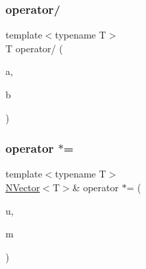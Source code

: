 \mbox{\label{class_n_p_matrix_a12aeb8ceae55cbd9937701cb056b113b}} 
\subsubsection{\texorpdfstring{operator/}{operator/}\hspace{0.1cm}{\footnotesize\ttfamily [2/2]}}
{\footnotesize\ttfamily template$<$typename T$>$ \\
T operator/ (\begin{DoxyParamCaption}\item[{const \mbox{\hyperlink{class_n_p_matrix}{N\+P\+Matrix}}$<$ T $>$ \&}]{a,  }\item[{const \mbox{\hyperlink{class_n_p_matrix}{N\+P\+Matrix}}$<$ T $>$ \&}]{b }\end{DoxyParamCaption})\hspace{0.3cm}{\ttfamily [friend]}}

\mbox{\label{class_n_p_matrix_a3ac1836124d15848447935dd5ab657eb}} 
\subsubsection{\texorpdfstring{operator $\ast$=}{operator *=}}
{\footnotesize\ttfamily template$<$typename T$>$ \\
\mbox{\hyperlink{class_n_vector}{N\+Vector}}$<$T$>$\& operator $\ast$= (\begin{DoxyParamCaption}\item[{\mbox{\hyperlink{class_n_vector}{N\+Vector}}$<$ T $>$ \&}]{u,  }\item[{const \mbox{\hyperlink{class_n_p_matrix}{N\+P\+Matrix}}$<$ T $>$ \&}]{m }\end{DoxyParamCaption})\hspace{0.3cm}{\ttfamily [friend]}}

\mbox{\label{class_n_p_matrix_a4eb92336cc8c489af26d55dd36bd7e90}} 
